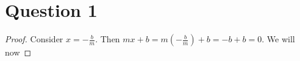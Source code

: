 \documentclass{article}
\begin{document}
    \section{Question 1}
    \begin{proof}
        Consider $ x = -\frac{b}{m} $. Then $ mx + b = m(-\frac{b}{m}) + b = -b + b = 0 $. We will now 
    \end{proof}
\end{document}
